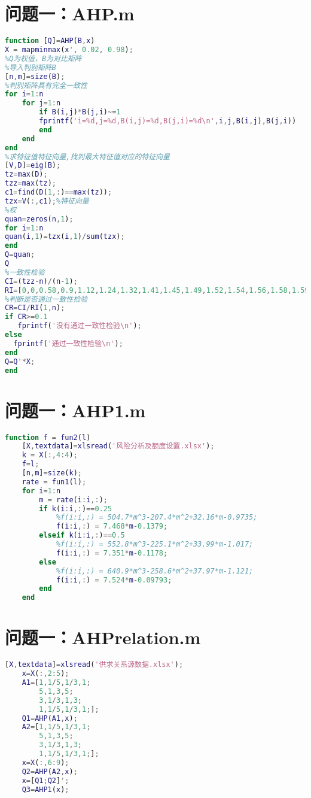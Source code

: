 \documentclass[withoutpreface,bwprint]{cumcmthesis}
\begin{document}
\begin{appendices}
    \section{问题一：AHP.m}
    \begin{lstlisting}[language=matlab]
    function [Q]=AHP(B,x)
X = mapminmax(x', 0.02, 0.98);
%Q为权值，B为对比矩阵
%导入判别矩阵B
[n,m]=size(B);
%判别矩阵具有完全一致性
for i=1:n
    for j=1:n
        if B(i,j)*B(j,i)~=1   
        fprintf('i=%d,j=%d,B(i,j)=%d,B(j,i)=%d\n',i,j,B(i,j),B(j,i))  
        end  
    end
end
%求特征值特征向量,找到最大特征值对应的特征向量
[V,D]=eig(B);
tz=max(D);
tzz=max(tz);
c1=find(D(1,:)==max(tz));
tzx=V(:,c1);%特征向量
%权
quan=zeros(n,1);
for i=1:n
quan(i,1)=tzx(i,1)/sum(tzx);
end
Q=quan;
Q
%一致性检验
CI=(tzz-n)/(n-1);
RI=[0,0,0.58,0.9,1.12,1.24,1.32,1.41,1.45,1.49,1.52,1.54,1.56,1.58,1.59];
%判断是否通过一致性检验
CR=CI/RI(1,n);
if CR>=0.1
   fprintf('没有通过一致性检验\n');
else
  fprintf('通过一致性检验\n');
end
Q=Q'*X;
end
\end{lstlisting}

\section{问题一：AHP1.m}
\begin{lstlisting}[language=matlab]
    function f = fun2(l)
    [X,textdata]=xlsread('风险分析及额度设置.xlsx');
    k = X(:,4:4);
    f=l;
    [n,m]=size(k);
    rate = fun1(l);
    for i=1:n
        m = rate(i:i,:);
        if k(i:i,:)==0.25
            %f(i:i,:) = 504.7*m^3-207.4*m^2+32.16*m-0.9735;
            f(i:i,:) = 7.468*m-0.1379;
        elseif k(i:i,:)==0.5
            %f(i:i,:) = 552.8*m^3-225.1*m^2+33.99*m-1.017;
            f(i:i,:) = 7.351*m-0.1178;
        else
            %f(i:i,:) = 640.9*m^3-258.6*m^2+37.97*m-1.121;
            f(i:i,:) = 7.524*m-0.09793;
        end
    end
\end{lstlisting}  

\section{问题一：AHPrelation.m}
\begin{lstlisting}[language=matlab]
    [X,textdata]=xlsread('供求关系源数据.xlsx');
    x=X(:,2:5);
    A1=[1,1/5,1/3,1;
        5,1,3,5;
        3,1/3,1,3;
        1,1/5,1/3,1;];
    Q1=AHP(A1,x);
    A2=[1,1/5,1/3,1;
        5,1,3,5;
        3,1/3,1,3;
        1,1/5,1/3,1;];
    x=X(:,6:9);
    Q2=AHP(A2,x);
    x=[Q1;Q2]';
    Q3=AHP1(x);
\end{lstlisting}


\end{appendices}
\end{document}
